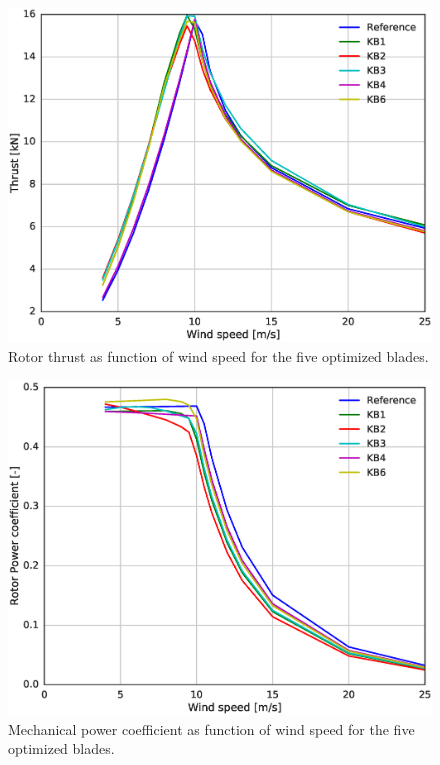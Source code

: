 
\begin{figure}[!ht]
\begin{center}
	\includegraphics[width=.85\linewidth]{figures/KBcomp_thrust.eps}
\end{center}
\caption{Rotor thrust as function of wind speed for the five optimized blades.}
\label{fig:thrust}
\end{figure}

\begin{figure}[!ht]
\begin{center}
	\includegraphics[width=.85\linewidth]{figures/KBcomp_Cp.eps}
\end{center}
\caption{Mechanical power coefficient as function of wind speed for the five optimized blades.}
\label{fig:cp}
\end{figure}

